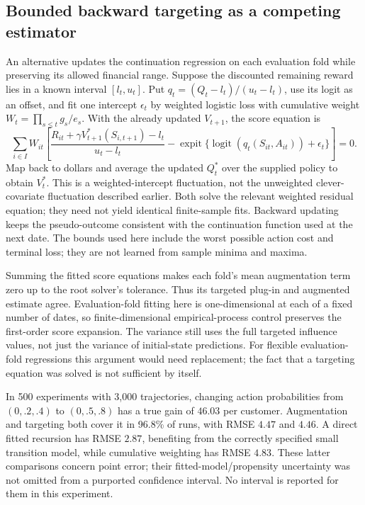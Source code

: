 \subsection{Bounded backward targeting as a competing estimator}
An alternative updates the continuation regression on each evaluation
fold while preserving its allowed financial range. Suppose the discounted
remaining reward lies in a known interval $[l_t,u_t]$. Put
$q_t=(Q_t-l_t)/(u_t-l_t)$, use its logit as an offset, and fit one
intercept $\epsilon_t$ by weighted logistic loss with cumulative weight
$W_t=\prod_{s\le t}g_s/e_s$. With the already updated $V_{t+1}$,
the score equation is
\[
 \sum_{i\in I}W_{it}\left[
 \frac{R_{it}+\gamma V_{t+1}^*(S_{i,t+1})-l_t}{u_t-l_t}
 -\operatorname{expit}\{\operatorname{logit}(q_t(S_{it},A_{it}))+\epsilon_t\}
 \right]=0.
\]
Map back to dollars and average the updated $Q_t^*$ over the supplied
policy to obtain $V_t^*$. This is a weighted-intercept fluctuation, not
the unweighted clever-covariate fluctuation described earlier. Both solve
the relevant weighted residual equation; they need not yield identical
finite-sample fits. Backward updating keeps the pseudo-outcome consistent
with the continuation function used at the next date. The bounds used here
include the worst possible action cost and terminal loss; they are not
learned from sample minima and maxima.

Summing the fitted score equations makes each fold's mean augmentation
term zero up to the root solver's tolerance. Thus its targeted plug-in and
augmented estimate agree. Evaluation-fold fitting here is one-dimensional
at each of a fixed number of dates, so finite-dimensional empirical-process
control preserves the first-order score expansion. The variance still uses
the full targeted influence values, not just the variance of initial-state
predictions. For flexible evaluation-fold regressions this argument would
need replacement; the fact that a targeting equation was solved is not
sufficient by itself.

In 500 experiments with 3,000 trajectories, changing action probabilities
from $(0,.2,.4)$ to $(0,.5,.8)$ has a true gain of $46.03$ per customer.
Augmentation and targeting both cover it in 96.8\% of runs, with RMSE
$4.47$ and $4.46$. A direct fitted recursion has RMSE $2.87$, benefiting
from the correctly specified small transition model, while cumulative
weighting has RMSE $4.83$. These latter comparisons concern point error;
their fitted-model/propensity uncertainty was not omitted from a purported
confidence interval. No interval is reported for them in this experiment.

